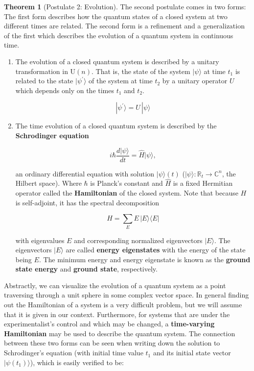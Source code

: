 \documentclass{article}
\theoremstyle{definition}
\newtheorem{theorem}{Theorem}[section]
\begin{document}
    \begin{theorem}[Postulate 2: Evolution]
    The second postulate comes in two forms: The first form describes how the quantum states of a closed system at two different times are related. The second form is a refinement and a generalization of the first which describes the evolution of a quantum system in continuous time.
    \begin{enumerate}
      \item The evolution of a closed quantum system is described by a unitary transformation in $\text{U}(n)$. That is, the state of the system $|\psi \rangle$ at time $t_1$ is related to the state $|\psi^\prime \rangle$ of the system at time $t_2$ by a unitary operator $U$ which depends only on the times $t_1$ and $t_2$.

        \[|\psi^\prime \rangle = U \, |\psi \rangle\]

      \item The time evolution of a closed quantum system is described by the \textbf{Schrodinger equation}

          \[i \hbar \frac{d |\psi \rangle}{dt} = \hat{H} |\psi \rangle, \]

        an ordinary differential equation with solution $| \psi \rangle (t)$ ($|\psi\rangle: \mathbb{R}_t \longrightarrow \mathbb{C}^n$, the Hilbert space). Where $\hbar$ is Planck's constant and $\hat{H}$ is a fixed Hermitian operator called the \textbf{Hamiltonian} of the closed system. Note that because $H$ is self-adjoint, it has the spectral decomposition

          \[H = \sum_{E} E \, |E \rangle \langle E |\]

        with eigenvalues $E$ and corresponding normalized eigenvectors $|E \rangle$. The eigenvectors $|E \rangle$ are called \textbf{energy eigenstates} with the energy of the state being $E$. The minimum energy and energy eigenstate is known as the \textbf{ground state energy} and \textbf{ground state}, respectively.
    \end{enumerate}
    \end{theorem}

    Abstractly, we can visualize the evolution of a quantum system as a point traversing through a unit sphere in some complex vector space. In general finding out the Hamiltonian of a system is a very difficult problem, but we will assume that it is given in our context. Furthermore, for systems that are under the experimentalist's control and which may be changed, a \textbf{time-varying Hamiltonian} may be used to describe the quantum system. The connection between these two forms can be seen when writing down the solution to Schrodinger's equation (with initial time value $t_1$ and its initial state vector $|\psi (t_1)\rangle$), which is easily verified to be:
\end{document}
